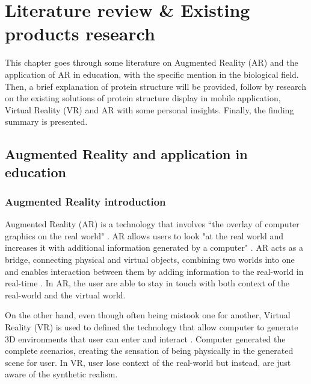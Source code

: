 \chapter{Literature review \& Existing products research}
\label{ch:litRev}

This chapter goes through some literature on Augmented Reality (AR) and the application of AR in education, with the specific mention in the biological field. Then, a brief explanation of protein structure will be provided, follow by research on the existing solutions of protein structure display in mobile application, Virtual Reality (VR) and AR with some personal insights. Finally, the finding summary is presented.

\section{Augmented Reality and application in education}
\subsection{Augmented Reality introduction}
Augmented Reality (AR) is a technology that involves ``the overlay of computer graphics on the real world" \parencite{silva_introduction_2003}. AR allows users to look "at the real world and increases it with additional information generated by a computer" \parencite{chamba-eras_augmented_2017}. AR acts as a bridge, connecting physical and virtual objects, combining two worlds into one and enables interaction between them by adding information to the real-world in real-time \parencite{chamba-eras_augmented_2017}. In AR, the user are able to stay in touch with both context of the real-world and the virtual world. 

On the other hand, even though often being mistook one for another, Virtual Reality (VR) is used to defined the technology that allow computer to generate 3D environments that user can enter and interact \parencite{silva_introduction_2003}. Computer generated the complete scenarios, creating the sensation of being physically in the generated scene for user. In VR, user lose context of the real-world but instead, are just aware of the synthetic realism. 

